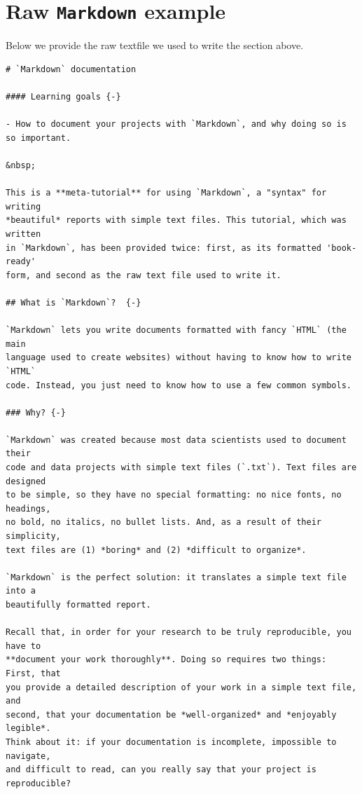 \documentclass[
]{book}
\begin{document}
\hypertarget{raw-markdown-example}{%
\section*{\texorpdfstring{Raw \texttt{Markdown} example}{Raw Markdown example}}\label{raw-markdown-example}}

Below we provide the raw textfile we used to write the section above.

\begin{verbatim}
# `Markdown` documentation 

#### Learning goals {-}

- How to document your projects with `Markdown`, and why doing so is so important.

&nbsp;  

This is a **meta-tutorial** for using `Markdown`, a "syntax" for writing
*beautiful* reports with simple text files. This tutorial, which was written
in `Markdown`, has been provided twice: first, as its formatted 'book-ready' 
form, and second as the raw text file used to write it.  

## What is `Markdown`?  {-}  

`Markdown` lets you write documents formatted with fancy `HTML` (the main
language used to create websites) without having to know how to write `HTML`
code. Instead, you just need to know how to use a few common symbols. 

### Why? {-} 

`Markdown` was created because most data scientists used to document their
code and data projects with simple text files (`.txt`). Text files are designed
to be simple, so they have no special formatting: no nice fonts, no headings,
no bold, no italics, no bullet lists. And, as a result of their simplicity,
text files are (1) *boring* and (2) *difficult to organize*.  

`Markdown` is the perfect solution: it translates a simple text file into a
beautifully formatted report.  

Recall that, in order for your research to be truly reproducible, you have to
**document your work thoroughly**. Doing so requires two things: First, that
you provide a detailed description of your work in a simple text file, and
second, that your documentation be *well-organized* and *enjoyably legible*.
Think about it: if your documentation is incomplete, impossible to navigate,
and difficult to read, can you really say that your project is reproducible?


\end{verbatim}
\end{document}
